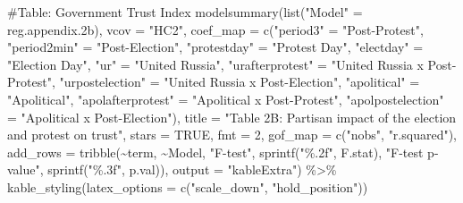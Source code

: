 \documentclass[
  letterpaper,
  DIV=11,
  numbers=noendperiod]{scrartcl}
\newenvironment{Shaded}{\begin{snugshade}}{\end{snugshade}}
\newcommand{\AttributeTok}[1]{\textcolor[rgb]{0.40,0.45,0.13}{#1}}
\newcommand{\CommentTok}[1]{\textcolor[rgb]{0.37,0.37,0.37}{#1}}
\newcommand{\ConstantTok}[1]{\textcolor[rgb]{0.56,0.35,0.01}{#1}}
\newcommand{\DecValTok}[1]{\textcolor[rgb]{0.68,0.00,0.00}{#1}}
\newcommand{\FloatTok}[1]{\textcolor[rgb]{0.68,0.00,0.00}{#1}}
\newcommand{\FunctionTok}[1]{\textcolor[rgb]{0.28,0.35,0.67}{#1}}
\newcommand{\NormalTok}[1]{\textcolor[rgb]{0.00,0.23,0.31}{#1}}
\newcommand{\OtherTok}[1]{\textcolor[rgb]{0.00,0.23,0.31}{#1}}
\newcommand{\SpecialCharTok}[1]{\textcolor[rgb]{0.37,0.37,0.37}{#1}}
\newcommand{\StringTok}[1]{\textcolor[rgb]{0.13,0.47,0.30}{#1}}
\begin{document}
\begin{Shaded}
\begin{Highlighting}[]
\CommentTok{\#Table: Government Trust Index}
\FunctionTok{modelsummary}\NormalTok{(}\FunctionTok{list}\NormalTok{(}\StringTok{"Model"} \OtherTok{=}\NormalTok{ reg.appendix}\FloatTok{.2}\NormalTok{b),}
             \AttributeTok{vcov =} \StringTok{"HC2"}\NormalTok{,}
             \AttributeTok{coef\_map =} \FunctionTok{c}\NormalTok{(}\StringTok{"period3"} \OtherTok{=} \StringTok{"Post{-}Protest"}\NormalTok{,}
                          \StringTok{"period2min"} \OtherTok{=} \StringTok{"Post{-}Election"}\NormalTok{,}
                          \StringTok{"protestday"} \OtherTok{=} \StringTok{"Protest Day"}\NormalTok{,}
                          \StringTok{"electday"} \OtherTok{=} \StringTok{"Election Day"}\NormalTok{,}
                          \StringTok{"ur"} \OtherTok{=} \StringTok{"United Russia"}\NormalTok{,}
                          \StringTok{"urafterprotest"} \OtherTok{=} \StringTok{"United Russia x Post{-}Protest"}\NormalTok{,}
                          \StringTok{"urpostelection"} \OtherTok{=} \StringTok{"United Russia x Post{-}Election"}\NormalTok{,}
                          \StringTok{"apolitical"} \OtherTok{=} \StringTok{"Apolitical"}\NormalTok{,}
                          \StringTok{"apolafterprotest"} \OtherTok{=} \StringTok{"Apolitical x Post{-}Protest"}\NormalTok{,}
                          \StringTok{"apolpostelection"} \OtherTok{=} \StringTok{"Apolitical x Post{-}Election"}\NormalTok{),}
             \AttributeTok{title =} \StringTok{"Table 2B: Partisan impact of the election and protest on trust"}\NormalTok{,}
             \AttributeTok{stars =} \ConstantTok{TRUE}\NormalTok{, }\AttributeTok{fmt =} \DecValTok{2}\NormalTok{, }\AttributeTok{gof\_map =} \FunctionTok{c}\NormalTok{(}\StringTok{"nobs"}\NormalTok{, }\StringTok{"r.squared"}\NormalTok{),}
             \AttributeTok{add\_rows =} \FunctionTok{tribble}\NormalTok{(}\SpecialCharTok{\textasciitilde{}}\NormalTok{term, }\SpecialCharTok{\textasciitilde{}}\NormalTok{Model,}
                      \StringTok{"F{-}test"}\NormalTok{, }\FunctionTok{sprintf}\NormalTok{(}\StringTok{"\%.2f"}\NormalTok{, F.stat),}
                      \StringTok{"F{-}test p{-}value"}\NormalTok{,  }\FunctionTok{sprintf}\NormalTok{(}\StringTok{"\%.3f"}\NormalTok{, p.val)),}
             \AttributeTok{output =} \StringTok{"kableExtra"}\NormalTok{) }\SpecialCharTok{\%\textgreater{}\%} 
  \FunctionTok{kable\_styling}\NormalTok{(}\AttributeTok{latex\_options =} \FunctionTok{c}\NormalTok{(}\StringTok{"scale\_down"}\NormalTok{, }\StringTok{"hold\_position"}\NormalTok{))}
\end{Highlighting}
\end{Shaded}
\end{document}

